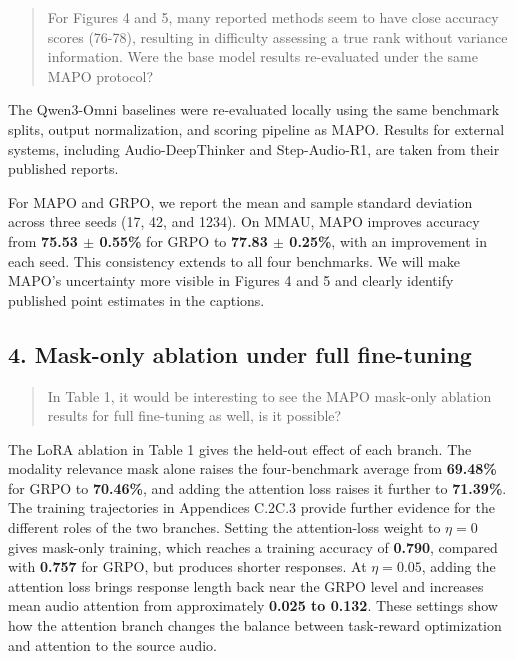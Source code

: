 \begin{quote}\small\color{ReviewQuote}
For Figures 4 and 5, many reported methods seem to have close accuracy scores (76-78), resulting in difficulty assessing a true rank without variance information. Were the base model results re-evaluated under the same MAPO protocol?

\end{quote}

The Qwen3-Omni baselines were re-evaluated locally using the same benchmark splits, output normalization, and scoring pipeline as MAPO. Results for external systems, including Audio-DeepThinker and Step-Audio-R1, are taken from their published reports.

For MAPO and GRPO, we report the mean and sample standard deviation across three seeds (17, 42, and 1234). On MMAU, MAPO improves accuracy from \textbf{75.53 \ensuremath{\pm} 0.55\%} for GRPO to \textbf{77.83 \ensuremath{\pm} 0.25\%}, with an improvement in each seed. This consistency extends to all four benchmarks. We will make MAPO's uncertainty more visible in Figures 4 and 5 and clearly identify published point estimates in the captions.

\subsection*{4. Mask-only ablation under full fine-tuning}

\begin{quote}\small\color{ReviewQuote}
In Table 1, it would be interesting to see the MAPO mask-only ablation results for full fine-tuning as well, is it possible?

\end{quote}

The LoRA ablation in Table 1 gives the held-out effect of each branch. The modality relevance mask alone raises the four-benchmark average from \textbf{69.48\%} for GRPO to \textbf{70.46\%}, and adding the attention loss raises it further to \textbf{71.39\%}. The training trajectories in Appendices C.2\textendash{}C.3 provide further evidence for the different roles of the two branches. Setting the attention-loss weight to $\eta=0$ gives mask-only training, which reaches a training accuracy of \textbf{0.790}, compared with \textbf{0.757} for GRPO, but produces shorter responses. At $\eta=0.05$, adding the attention loss brings response length back near the GRPO level and increases mean audio attention from approximately \textbf{0.025 to 0.132}. These settings show how the attention branch changes the balance between task-reward optimization and attention to the source audio.

